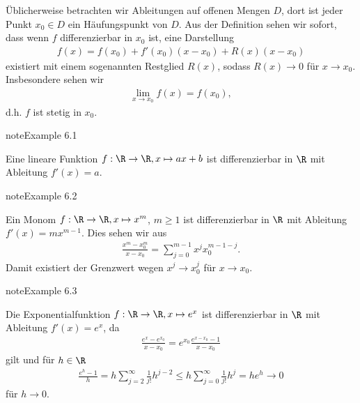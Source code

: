 \documentclass[letterpaper,10pt,english]{jupyterBook}
\begin{document}
Üblicherweise betrachten wir Ableitungen auf offenen Mengen \(D\), dort ist jeder Punkt \(x_0 \in D\) ein Häufungspunkt von \(D\).
Aus der Definition sehen wir sofort, dass wenn \(f\) differenzierbar in \(x_0\) ist, eine Darstellung
\begin{equation*}
\begin{split} f(x) = f(x_0) + f'(x_0)(x-x_0) +R(x)(x-x_0)\end{split}
\end{equation*}
existiert mit einem sogenannten Restglied \(R(x)\), sodass \(R(x) \rightarrow 0 \) für \(x \rightarrow x_0\). Insbesondere sehen wir
\begin{equation*}
\begin{split} \lim_{x \rightarrow x_0} f(x) = f(x_0),\end{split}
\end{equation*}
d.h. \(f\) ist stetig in \(x_0\).
\label{differential/differential:example-1}
\begin{sphinxadmonition}{note}{Example 6.1}



Eine lineare Funktion \(f: \R \rightarrow \R, x \mapsto a x + b\) ist differenzierbar in \(\R\) mit Ableitung \(f'(x) = a\).
\end{sphinxadmonition}
\label{differential/differential:example-2}
\begin{sphinxadmonition}{note}{Example 6.2}



Ein Monom \(f: \R \rightarrow \R, x \mapsto x^m\), \(m \geq 1\) ist differenzierbar in \(\R\) mit Ableitung \(f'(x) = m x^{m-1}\). Dies sehen wir aus
\begin{equation*}
\begin{split} \frac{x^m - x_0^m}{x-x_0} = \sum_{j=0}^{m-1} x^j x_0^{m-1-j} .\end{split}
\end{equation*}
Damit existiert der Grenzwert wegen \(x^j \rightarrow x_0^j\) für \(x \rightarrow x_0\).
\end{sphinxadmonition}
\label{differential/differential:example-3}
\begin{sphinxadmonition}{note}{Example 6.3}



Die Exponentialfunktion \(f: \R \rightarrow \R, x \mapsto e^x\) ist differenzierbar in \(\R\) mit Ableitung \(f'(x) = e^x\), da
\begin{equation*}
\begin{split} \frac{e^x - e^{x_0}}{x-x_0} = e^{x_0}  \frac{e^{x-x_0}-1}{x-x_0}\end{split}
\end{equation*}
gilt und für \(h \in \R\)
\begin{equation*}
\begin{split} \frac{e^h - 1}h =  h \sum_{j=2}^\infty \frac{1}{j!}h^{j-2} \leq h  \sum_{j=0}^\infty \frac{1}{j!}h^{j} = h e^h \rightarrow 0\end{split}
\end{equation*}
für \(h \rightarrow 0\).
\end{sphinxadmonition}
\end{document}
